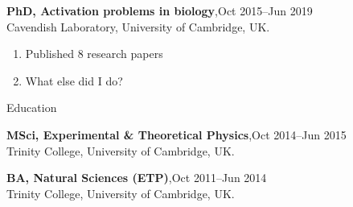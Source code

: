 \documentclass{fancycv}
\begin{document}
\begin{minipage}[t]{10.5cm}
\textbf{PhD, Activation problems in biology},\hfill Oct 2015--Jun 2019\\
{\slimjim Cavendish Laboratory, University of Cambridge, UK.}

\begin{enumerate}
\item Published 8 research papers
\item What else did I do?
\end{enumerate}

\vspace{7cm}

{\fontsize{32}{40} Education}

\vspace{0.7cm}

\textbf{MSci, Experimental \& Theoretical Physics},\hfill Oct 2014--Jun 2015\\
{\slimjim Trinity College, University of Cambridge, UK.}

\vspace{0.7cm}

\textbf{BA, Natural Sciences (ETP)},\hfill Oct 2011--Jun 2014\\
{\slimjim Trinity College, University of Cambridge, UK.}
\end{minipage}\\
\end{document}
